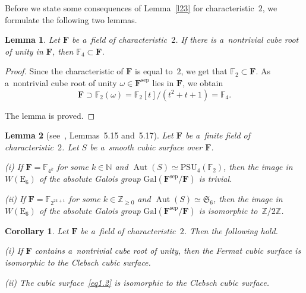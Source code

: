 \documentclass{amsart}
\numberwithin{equation}{section}
\theoremstyle{plain}
\newtheorem{lemma}{Lemma}
\newtheorem{corollary}{Corollary}
\theoremstyle{definition}
\theoremstyle{remark}
\begin{document}
Before we state some consequences of Lemma~\ref{l23} for characteristic~$2$, we formulate the following two lemmas.

\begin{lemma}
\label{l24}
Let $\mathbf{F}$ be a~field of characteristic~$2$. If there is a~nontrivial cube root of unity in $\mathbf{F}$, then $\mathbb{F}_4 \subset \mathbf{F}$.
\end{lemma}

\begin{proof}
Since the characteristic of $\mathbf{F}$ is equal to~$2$, we get that $\mathbb{F}_2 \subset \mathbf{F}$. As a~nontrivial cube root of unity $\omega \in \mathbf{F}^{\mathrm{sep}}$ lies in $\mathbf{F}$, we obtain
$$
\mathbf{F} \supset \mathbb{F}_2(\omega)=\mathbb{F}_2[t]/(t^2+t+1)=\mathbb{F}_4.
$$

The lemma is proved.
\end{proof}

\begin{lemma}[{see~\cite{18}, Lemmas~5.15 and~5.17}]
\label{l25}
Let $\mathbf{F}$ be a~finite field of characteristic~$2$. Let $S$ be a~smooth cubic surface over $\mathbf{F}$.

{\rm (i)} If\/ $\mathbf{F}=\mathbb{F}_{4^k}$ for some $k \in \mathbb{N}$ and $\operatorname{Aut}(S) \simeq \mathrm{PSU}_4(\mathbb{F}_2)$, then the image in~$W(\mathrm{E}_6)$ of the absolute Galois group $\mathrm{Gal}(\mathbf{F}^{\mathrm{sep}}/\mathbf{F})$ is trivial.

{\rm (ii)} If\/ $\mathbf{F}=\mathbb{F}_{2^{2k+1}}$ for some $k \in \mathbb{Z}_{\geqslant 0}$ and $\operatorname{Aut}(S) \simeq \mathfrak{S}_6$, then the image in $W(\mathrm{E}_6)$ of the absolute Galois group $\mathrm{Gal}(\mathbf{F}^{\mathrm{sep}}/\mathbf{F})$ is isomorphic to~$\mathbb{Z}/2\mathbb{Z}$.
\end{lemma}

\begin{corollary}
\label{c6}
Let $\mathbf{F}$ be a~field of characteristic~$2$. Then the following hold.

{\rm (i)} If\/ $\mathbf{F}$ contains a~nontrivial cube root of unity, then the Fermat cubic surface is isomorphic to the Clebsch cubic surface.

{\rm (ii)} The cubic surface~\eqref{eq1.2} is isomorphic to the Clebsch cubic surface.
\end{corollary}
\end{document}
